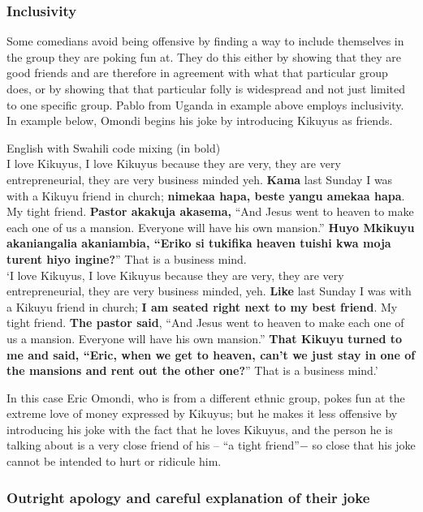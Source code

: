 \documentclass[output=paper]{langsci/langscibook}
\begin{document}
\subsubsection{Inclusivity }

Some comedians avoid being offensive by finding a way to include themselves in the group they are poking fun at. They do this either by showing that they are good friends and are therefore in agreement with what that particular group does, or by showing that that particular folly is widespread and not just limited to one specific group. Pablo from Uganda in example  above employs inclusivity. In example  below, Omondi begins his joke by introducing Kikuyus as friends. 

\ea\label{ex:muaka:14}
{English with Swahili code mixing (in bold)}\\
I love Kikuyus, I love Kikuyus because they are very, they are very entrepreneurial, they are very business minded yeh. \textbf{Kama} last Sunday I was with a Kikuyu friend in church; \textbf{nimekaa hapa, beste yangu amekaa hapa}. My tight friend. \textbf{Pastor akakuja akasema,} “And Jesus went to heaven to make each one of us a mansion. Everyone will have his own mansion.” \textbf{Huyo Mkikuyu akaniangalia akaniambia, “Eriko si tukifika heaven tuishi kwa moja turent hiyo ingine?}” That is a business mind. \\
\glt ‘I love Kikuyus, I love Kikuyus because they are very, they are very entrepreneurial, they are very business minded, yeh. \textbf{Like} last Sunday I was with a Kikuyu friend in church; \textbf{I am seated right next to my best friend}. My tight friend. \textbf{The pastor said}, “And Jesus went to heaven to make each one of us a mansion. Everyone will have his own mansion.” \textbf{That Kikuyu turned to me and said, “Eric, when we get to heaven, can’t we just stay in one of the mansions and rent out the other one?}” That is a business mind.’ \citep{Quarshe2015}
\z

In this case Eric Omondi, who is from a different ethnic group, pokes fun at the extreme love of money expressed by Kikuyus; but he makes it less offensive by introducing his joke with the fact that he loves Kikuyus, and the person he is talking about is a very close friend of his – “a tight friend”$-$ so close that his joke cannot be intended to hurt or ridicule him.

\subsubsection{Outright apology and careful explanation of their joke }
\end{document}
